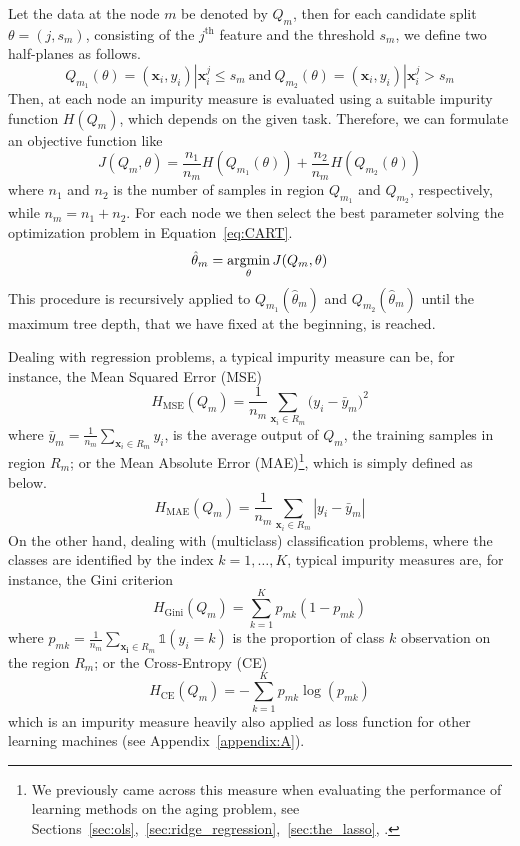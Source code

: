		Let the data at the node $m$ be denoted by $Q_m$, then for each candidate split $\theta=(j, s_m)$, consisting of the $j^{\text{th}}$ feature and the threshold $s_m$, we define two half-planes as follows.
		$$
		Q_{m_1}(\theta) = (\bm{x}_i, y_i) | \bm{x}_i^j \leq s_m~\text{and}~Q_{m_2}(\theta) = (\bm{x}_i, y_i) | \bm{x}_i^j > s_m
		$$
		Then, at each node an impurity measure is evaluated using a suitable impurity function $H(Q_m)$, which depends on the given task. Therefore, we can formulate an objective function like
		$$
		J(Q_m,\theta) = \frac{n_1}{n_m}H(Q_{m_1}(\theta)) + \frac{n_2}{n_m}H(Q_{m_2}(\theta))
		$$
		where $n_1$ and $n_2$ is the number of samples in region $Q_{m_1}$ and $Q_{m_2}$, respectively, while $n_m=n_1+n_2$.
		For each node we then select the best parameter solving the optimization problem in Equation~\eqref{eq:CART}.
		\begin{equation} \label{eq:CART}
			\hat \theta_m = \mathop{\mathrm{argmin}}\limits_{\theta} J(Q_m,\theta)
		\end{equation}
		This procedure is recursively applied to $Q_{m_1}(\hat \theta_m)$ and $Q_{m_2}(\hat \theta_m)$ until the maximum tree depth, that we have fixed at the beginning, is reached.
		
		Dealing with regression problems, a typical impurity measure can be, for instance, the Mean Squared Error (\ac{MSE})
		\begin{equation} \label{eq:MSE}
			H_{\text{MSE}}(Q_m) = \frac{1}{n_m} \sum_{\bm{x}_i \in R_m} \big(y_i - \bar y_m \big)^2
		\end{equation}
		where $\bar y_m = \frac{1}{n_m} \sum_{\bm{x}_i \in R_m} y_i$, is the average output of $Q_m$, \ie the training samples in region $R_m$;
		or the Mean Absolute Error (\ac{MAE})\footnote{ We previously came across this measure when evaluating the performance of learning methods on the aging problem, see Sections~\ref{sec:ols},~\ref{sec:ridge_regression},~\ref{sec:the_lasso}, \etc.}, which is simply defined as below.
		\begin{equation} \label{eq:MAE}
				H_{\text{MAE}}(Q_m) = \frac{1}{n_m} \sum_{\bm{x}_i \in R_m} | y_i - \bar y_m |
		\end{equation}
		On the other hand, dealing with (multiclass) classification problems, where the classes are identified by the index $k=1,\dots,K$, typical impurity measures are, for instance, the Gini criterion
		\begin{equation} \label{eq:gini}
			H_{\text{Gini}}(Q_m) = \sum_{k=1}^K p_{mk}(1-p_{mk})
		\end{equation}
		where $p_{mk}=\frac{1}{n_m} \sum_{\bm{x_i} \in R_m} \mathds{1}(y_i = k)$ is the proportion of class $k$ observation on the region $R_m$; or the Cross-Entropy (\ac{CE})
		\begin{equation} \label{eq:ce}
			H_{\text{CE}}(Q_m) = - \sum_{k=1}^K p_{mk} \log(p_{mk})
		\end{equation}
		which is an impurity measure heavily also applied as loss function for other  learning machines (see Appendix~\ref{appendix:A}).
		
